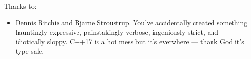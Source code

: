 \noindent
Thanks to:
\begin{itemize}
    \item Dennis Ritchie and Bjarne Stroustrup.  You've accidentally created something hauntingly expressive, painstakingly verbose, ingeniously strict, and idiotically sloppy.  C++17 is a hot mess but it's everwhere --- thank God it's type safe.  
\end{itemize}

